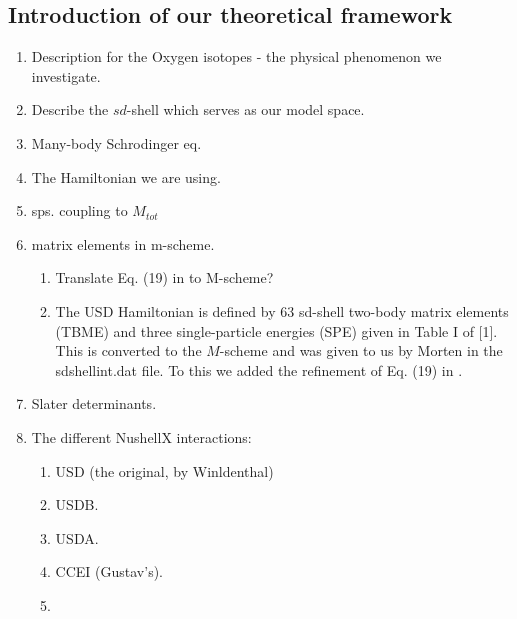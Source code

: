 \documentclass[aps,prl,reprint,groupedaddress]{revtex4-1}  %
\begin{document}
\subsection{Introduction of our theoretical framework}
\begin{enumerate}
\item Description for the Oxygen isotopes - the physical phenomenon we investigate.
\item Describe the $sd$-shell which serves as our model space.
\item Many-body Schrodinger eq.
\item The Hamiltonian we are using.
\item sps. coupling to $M_{tot}$
\item matrix elements in m-scheme. 
	\begin{enumerate}
	\item Translate Eq. (19) in \cite{Brown2006} to M-scheme? 
	\item The USD Hamiltonian is defined by 63 sd-shell two-body matrix elements (TBME) and three single-particle energies (SPE) given in Table I of [1]. This is converted to the $M$-scheme and was given to us by Morten in the sdshellint.dat file. To this we added the refinement of Eq. (19) in \cite{Brown2006}.
	\end{enumerate}
\item Slater determinants.
\item The different NushellX interactions:
	\begin{enumerate}
	\item USD (the original, by Winldenthal)
	\item USDB.
	\item USDA.
	\item CCEI (Gustav's).
	\item 
	\end{enumerate}
\end{enumerate}



\end{document}
